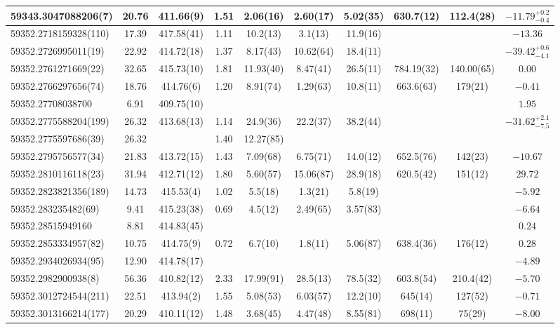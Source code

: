 \documentclass[preprint2, trackchanges]{aastex631}
\begin{document}
{{\begin{longtable}{lccccccccc}
\hline
59343.3047088206(7) & 20.76 & 411.66(9) & 1.51 & 2.06(16) & 2.60(17)  & 5.02(35) & 630.7(12) & 112.4(28) & $-11.79^{+0.2}_{-0.4}$ \\
\hline
59352.2718159328(110) & 17.39 & 417.58(41) & 1.11 & 10.2(13) & 3.1(13)  & 11.9(16) &  &  & $-13.36$ \\
\hline
59352.2726995011(19) & 22.92 & 414.72(18) & 1.37 & 8.17(43) & 10.62(64)  & 18.4(11) &  &  & $-39.42^{+0.6}_{-4.1}$ \\
\hline
59352.2761271669(22) & 32.65 & 415.73(10) & 1.81 & 11.93(40) & 8.47(41)  & 26.5(11) & 784.19(32) & 140.00(65) & $0.00$ \\
\hline
59352.2766297656(74) & 18.76 & 414.76(6) & 1.20 & 8.91(74) & 1.29(63)  & 10.8(11) & 663.6(63) & 179(21) & $-0.41$ \\
\hline
59352.27708038700 & 6.91 & 409.75(10) &  &  &   &  &  &  & $1.95$ \\
\hline
59352.2775588204(199) & 26.32 & 413.68(13) & 1.14 & 24.9(36) & 22.2(37)  & 38.2(44) &  &  & $-31.62^{+2.1}_{-7.5}$ \\
59352.2775597686(39) & 26.32 &  & 1.40 & 12.27(85) &   &  &  &  &  \\
\hline
59352.2795756577(34) & 21.83 & 413.72(15) & 1.43 & 7.09(68) & 6.75(71)  & 14.0(12) & 652.5(76) & 142(23) & $-10.67$ \\
\hline
59352.2810116118(23) & 31.94 & 412.71(12) & 1.80 & 5.60(57) & 15.06(87)  & 28.9(18) & 620.5(42) & 151(12) & $29.72$ \\
\hline
59352.2823821356(189) & 14.73 & 415.53(4) & 1.02 & 5.5(18) & 1.3(21)  & 5.8(19) &  &  & $-5.92$ \\
\hline
59352.283235482(69) & 9.41 & 415.23(38) & 0.69 & 4.5(12) & 2.49(65)  & 3.57(83) &  &  & $-6.64$ \\
\hline
59352.28515949160 & 8.81 & 414.83(45) &  &  &  &   &  &  & $0.24$ \\
\hline
59352.2853334957(82) & 10.75 & 414.75(9) & 0.72 & 6.7(10) & 1.8(11)  & 5.06(87) & 638.4(36) & 176(12) & $0.28$ \\
\hline
59352.2934026934(95) & 12.90 & 414.78(17) &  &   &  &  &  &  & $-4.89$ \\
\hline
59352.2982900938(8) & 56.36 & 410.82(12) & 2.33 & 17.99(91) & 28.5(13)  & 78.5(32) & 603.8(54) & 210.4(42) & $-5.70$ \\
\hline
59352.3012724544(211) & 22.51 & 413.94(2) & 1.55 & 5.08(53) & 6.03(57)  & 12.2(10) & 645(14) & 127(52) & $-0.71$ \\
\hline
59352.3013166214(177) & 20.29 & 410.11(12) & 1.48 & 3.68(45) & 4.47(48)  & 8.55(81) & 698(11) & 75(29) & $-8.00$ \\

\end{longtable}}}
\end{document}
